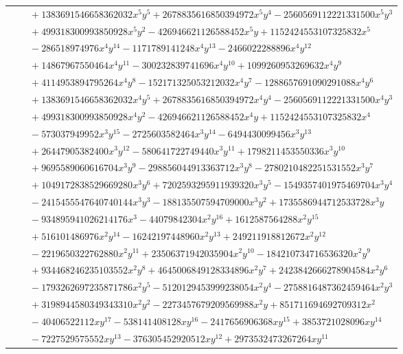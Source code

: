 \documentclass[11pt]{article}
\begin{document}
\begin{longtable}{@{}ll@{}}
 & $\quad +1383691546658362032x^{5}y^{5}+2678835616850394972x^{5}y^{4}-2560569112221331500x^{5}y^{3}$\\
 & $\quad +499318300993850928x^{5}y^{2}-426946621126588452x^{5}y+1152424553107325832x^{5}$\\
 & $\quad -286518974976x^{4}y^{14}-1171789141248x^{4}y^{13}-2466022288896x^{4}y^{12}$\\
 & $\quad +14867967550464x^{4}y^{11}-300232839741696x^{4}y^{10}+1099260953269632x^{4}y^{9}$\\
 & $\quad +4114953894795264x^{4}y^{8}-152171325053212032x^{4}y^{7}-1288657691090291088x^{4}y^{6}$\\
 & $\quad +1383691546658362032x^{4}y^{5}+2678835616850394972x^{4}y^{4}-2560569112221331500x^{4}y^{3}$\\
 & $\quad +499318300993850928x^{4}y^{2}-426946621126588452x^{4}y+1152424553107325832x^{4}$\\
 & $\quad -573037949952x^{3}y^{15}-2725603582464x^{3}y^{14}-6494430099456x^{3}y^{13}$\\
 & $\quad +26447905382400x^{3}y^{12}-580641722749440x^{3}y^{11}+1798211453550336x^{3}y^{10}$\\
 & $\quad +9695589060616704x^{3}y^{9}-298856044913363712x^{3}y^{8}-2780210482251531552x^{3}y^{7}$\\
 & $\quad +1049172838529669280x^{3}y^{6}+7202593295911939320x^{3}y^{5}-1549357401975469704x^{3}y^{4}$\\
 & $\quad -2415455547640740144x^{3}y^{3}-188135507594709000x^{3}y^{2}+1735586944712533728x^{3}y$\\
 & $\quad -934895941026214176x^{3}-44079842304x^{2}y^{16}+1612587564288x^{2}y^{15}$\\
 & $\quad +516101486976x^{2}y^{14}-16242197448960x^{2}y^{13}+249211918812672x^{2}y^{12}$\\
 & $\quad -2219650322762880x^{2}y^{11}+23506371942035904x^{2}y^{10}-184210734716536320x^{2}y^{9}$\\
 & $\quad +934468246235103552x^{2}y^{8}+4645006849128334896x^{2}y^{7}+2423842666278904584x^{2}y^{6}$\\
 & $\quad -1793262697235871786x^{2}y^{5}-5120129453999238054x^{2}y^{4}-2758816487362459464x^{2}y^{3}$\\
 & $\quad +3198944580349343310x^{2}y^{2}-2273457679209569988x^{2}y+851711694692709312x^{2}$\\
 & $\quad -40406522112xy^{17}-538141408128xy^{16}-2417656906368xy^{15}+3853721028096xy^{14}$\\
 & $\quad -7227529575552xy^{13}-376305452920512xy^{12}+2973532473267264xy^{11}$\\

\end{longtable}
\end{document}

